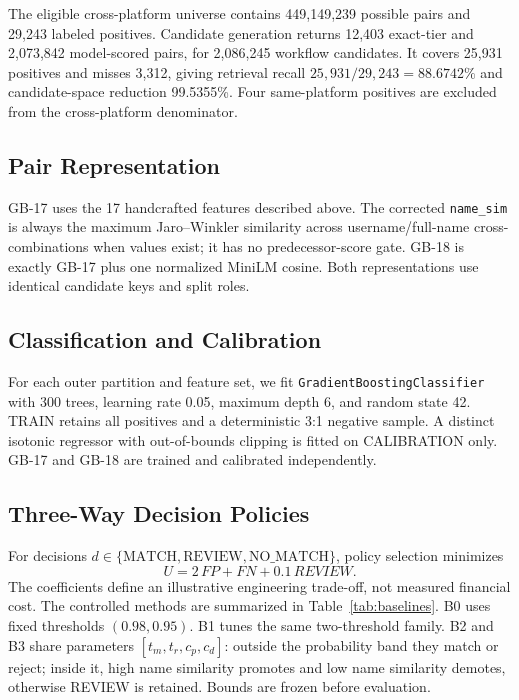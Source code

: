 \documentclass[conference]{IEEEtran}
\begin{document}
The eligible cross-platform universe contains 449,149,239 possible pairs and 29,243 labeled positives. Candidate generation returns 12,403 exact-tier and 2,073,842 model-scored pairs, for 2,086,245 workflow candidates. It covers 25,931 positives and misses 3,312, giving retrieval recall $25{,}931/29{,}243=88.6742\%$ and candidate-space reduction 99.5355\%. Four same-platform positives are excluded from the cross-platform denominator.

\subsection{Pair Representation}
GB-17 uses the 17 handcrafted features described above. The corrected \texttt{name\_sim} is always the maximum Jaro--Winkler similarity across username/full-name cross-combinations when values exist; it has no predecessor-score gate. GB-18 is exactly GB-17 plus one normalized MiniLM cosine. Both representations use identical candidate keys and split roles.

\subsection{Classification and Calibration}
For each outer partition and feature set, we fit \texttt{GradientBoostingClassifier} with 300 trees, learning rate 0.05, maximum depth 6, and random state 42. TRAIN retains all positives and a deterministic 3:1 negative sample. A distinct isotonic regressor with out-of-bounds clipping is fitted on CALIBRATION only. GB-17 and GB-18 are trained and calibrated independently.

\subsection{Three-Way Decision Policies}
For decisions $d\in\{\mathrm{MATCH},\mathrm{REVIEW},\mathrm{NO\_MATCH}\}$, policy selection minimizes
\begin{equation}
U=2\,FP+FN+0.1\,REVIEW.
\end{equation}
The coefficients define an illustrative engineering trade-off, not measured financial cost. The controlled methods are summarized in Table~\ref{tab:baselines}. B0 uses fixed thresholds $(0.98,0.95)$. B1 tunes the same two-threshold family. B2 and B3 share parameters $[t_m,t_r,c_p,c_d]$: outside the probability band they match or reject; inside it, high name similarity promotes and low name similarity demotes, otherwise REVIEW is retained. Bounds are frozen before evaluation.
\end{document}
